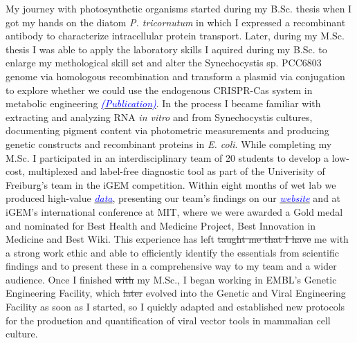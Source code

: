 \documentclass[11pt,a4paper,sans]{moderncv}
\begin{document}
\begin{spacing}{1.15}
\par\vspace*{1mm}

My journey with photosynthetic organisms started during my B.Sc. thesis when I got my hands on the diatom \textit{P. tricornutum} in which I expressed a recombinant antibody to characterize intracellular protein transport. 
Later, during my M.Sc. thesis I was able to apply the laboratory skills I aquired during my B.Sc. to enlarge my methological skill set and alter the Synechocystis sp. PCC6803 genome via homologous recombination and transform a plasmid via conjugation to explore whether we could use the endogenous CRISPR-Cas system in metabolic engineering {\href{https://www.ncbi.nlm.nih.gov/pubmed/29517395}{\textcolor{blue}{{\textit{(Publication)}}}}}. 
In the process I became familiar with extracting and analyzing RNA \textit{in vitro} and from Synechocystis cultures, documenting pigment content via photometric measurements and producing genetic constructs and recombinant proteins in \textit{E. coli}. 
While completing my M.Sc. I participated in an interdisciplinary team of 20 students to develop a low-cost, multiplexed and label-free diagnostic tool as part of the Univerisity of Freiburg's team in the iGEM competition.
Within eight months of wet lab we produced high-value {\href{https://www.ncbi.nlm.nih.gov/pubmed/29803867}{\textcolor{blue}{\textit{data}}}}, presenting our team's findings on our {\href{http://2015.igem.org/Team:Freiburg}{\textcolor{blue}{\textit{website}}}} and at iGEM's international conference at MIT, where we were awarded a Gold medal and nominated for Best Health and Medicine Project, Best Innovation in Medicine and Best Wiki.
This experience has left \sout{taught me that I have} me with a strong work ethic and able to efficiently identify the essentials from scientific findings and to present these in a comprehensive way to my team and a wider audience.
Once I finished \sout{with} my M.Sc., I began working in EMBL's Genetic Engineering Facility, which \sout {later} evolved into the Genetic and Viral Engineering Facility as soon as I started, so I quickly adapted and established new protocols for the production and quantification of viral vector tools in mammalian cell culture. 			

\end{spacing}
\end{document}

